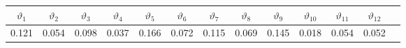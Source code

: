 \begin{tabular}{ccccccccccccc}
\hline
\hline
\textbf{$\vartheta_1$} & \textbf{$\vartheta_2$} & \textbf{$\vartheta_3$} & \textbf{$\vartheta_4$} & \textbf{$\vartheta_5$} & \textbf{$\vartheta_6$} & \textbf{$\vartheta_7$} & \textbf{$\vartheta_8$} & \textbf{$\vartheta_9$} & \textbf{$\vartheta_{10}$} & \textbf{$\vartheta_{11}$} & \textbf{$\vartheta_{12}$} \\
\hline
0.121 & 0.054 & 0.098 & 0.037 & 0.166 & 0.072 & 0.115 & 0.069 & 0.145 & 0.018 & 0.054 & 0.052 \\
\hline
\end{tabular}